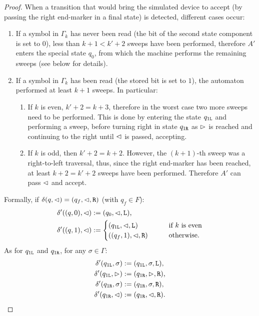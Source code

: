 \begin{proof}
	When a transition that would bring the simulated device to accept (by passing the right end-marker in a final state) is detected, different cases occur:
	\begin{enumerate}
		\item If a symbol in $\Gamma_k$ has never been read (\ie[,] the bit of the second state component is set to $0$), less than $k+1<k'+2$ sweeps have been performed, therefore $A'$ enters the special state $q_0$, from which the machine performs the remaining sweeps (see below for details).
		\item If a symbol in $\Gamma_k$ has been read (\ie[,] the stored bit is set to $1$), the automaton performed at least $k+1$ sweeps. In particular:
		      \begin{enumerate}
			      \item If $k$ is even, $k'+2=k+3$, therefore in the worst case two more sweeps need to be performed.
			            This is done by entering the state $q_{1\mathtt{L}}$ and performing a sweep, before turning right in state $q_{1\mathtt{R}}$ as $\rhd$ is reached and continuing to the right until $\lhd$ is passed, accepting.
			      \item If $k$ is odd, then $k'+2=k+2$. However, the $(k+1)$-th sweep was a right-to-left traversal, thus, since the right end-marker has been reached, at least $k+2=k'+2$ sweeps have been performed. Therefore $A'$ can pass $\lhd$ and accept.
		      \end{enumerate}
	\end{enumerate}

	Formally, if $\delta(q,\lhd)=(q_f,\lhd,\mathtt R)$ (with $q_f\in F$):
	\begin{align*}
		\delta'((q,0),\lhd) & := (q_0,\lhd,\mathtt L) \text,                               \\
		\delta'((q,1),\lhd) & := \begin{cases}
			                         (q_{1\mathtt{L}},\lhd,\mathtt L) \qquad     & \text{if $k$ is even}   \\
			                         ((q_f,1),\lhd,\mathtt R) \qquad & \text{otherwise} \text.
		                         \end{cases}
	\end{align*}
	As for $q_{1\mathtt{L}}$ and $q_{1\mathtt{R}}$, for any $\sigma\in\Gamma$:
	\begin{align*}
		\delta'(q_{1\mathtt{L}},\sigma) & :=(q_{1\mathtt{L}},\sigma,\mathtt L) \text, \\
		\delta'(q_{1\mathtt{L}},\rhd)   & :=(q_{1\mathtt{R}},\rhd,\mathtt R) \text,   \\
		\delta'(q_{1\mathtt{R}},\sigma) & :=(q_{1\mathtt{R}},\sigma,\mathtt R) \text, \\
		\delta'(q_{1\mathtt{R}},\lhd)   & :=(q_{1\mathtt{R}},\lhd,\mathtt R) \text.
	\end{align*}


\end{proof}
